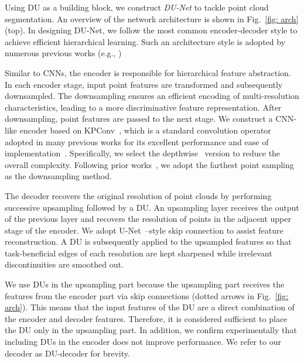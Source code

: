 \documentclass[a4paper,fleqn]{cas-dc}
\begin{document}
Using DU as a building block, we construct \textit{DU-Net} to tackle point cloud segmentation. An overview of the network architecture is shown in Fig.~\ref{fig: arch} (top). In designing DU-Net, we follow the most common encoder-decoder style to achieve efficient hierarchical learning. Such an architecture style is adopted by numerous previous works (e.g., \cite{qi2017pointnet++,thomas2019kpconv,xiang2021walk}) 

Similar to CNNs, the encoder is responsible for hierarchical feature abstraction. In each encoder stage, input point features are transformed and subsequently downsampled. The downsampling ensures an efficient encoding of multi-resolution characteristics, leading to a more discriminative feature representation. After downsampling, point features are passed to the next stage. We construct a CNN-like encoder based on KPConv~\cite{thomas2019kpconv}, which is a standard convolution operator adopted in many previous works for its excellent performance and ease of implementation~\cite{hu2020jsenet,lai2022stratified}. Specifically, we select the depthwise~\cite{sifre2014rigid} version to reduce the overall complexity. Following prior works~\cite{qi2017pointnet++,zhao2021point}, we adopt the farthest point sampling as the downsampling method.




The decoder recovers the original resolution of point clouds by performing successive upsampling followed by a DU. An upsampling layer receives the output of the previous layer and recovers the resolution of points in the adjacent upper stage of the encoder. We adopt U-Net~\cite{ronneberger2015u}--style skip connection to assist feature reconstruction. A DU is subsequently applied to the upsampled features so that task-beneficial edges of each resolution are kept sharpened while irrelevant discontinuities are smoothed out. 

We use DUs in the upsampling part because the upsampling part receives the features from the encoder part via skip connections (dotted arrows in Fig.~\ref{fig: arch}). This means that the input features of the DU are a direct combination of the encoder and decoder features. Therefore, it is considered sufficient to place the DU only in the upsampling part. In addition, we confirm experimentally that including DUs in the encoder does not improve performance.
We refer to our decoder as DU-decoder for brevity. 
\end{document}
